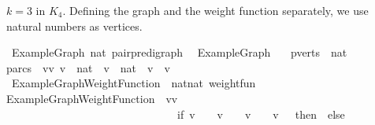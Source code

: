\begin{isabellebody}
\begin{isamarkuptext}
$k = 3$ in $K_4$. Defining the graph and the 
weight function separately, we use natural numbers as vertices.%
\end{isamarkuptext}\isamarkuptrue%
\isamarkupfalse%
\ ExampleGraph{\isacharcolon}{\isacharcolon}\ {\isachardoublequoteopen}nat\ pair{\isacharunderscore}pre{\isacharunderscore}digraph{\isachardoublequoteclose}\ \ \isanewline
{\isachardoublequoteopen}ExampleGraph\ {\isasymequiv}\ {\isacharparenleft}{\isacharbar}\ \isanewline
pverts\ {\isacharequal}\ {\isacharbraceleft}{}{\isacharcomma}{}{\isacharcomma}{}{\isacharcomma}{\isacharparenleft}{}{\isacharcolon}{\isacharcolon}nat{\isacharparenright}{\isacharbraceright}{\isacharcomma}\ \isanewline
parcs\ {\isacharequal}\ {\isacharbraceleft}{\isacharparenleft}vv\ v\ {\isasymin}\ {\isacharbraceleft}{}{\isacharcomma}{}{\isacharcomma}{}{\isacharcomma}{\isacharparenleft}{}{\isacharcolon}{\isacharcolon}nat{\isacharparenright}{\isacharbraceright}\ {\isasymand}\ v\ {\isasymin}\ {\isacharbraceleft}{}{\isacharcomma}{}{\isacharcomma}{}{\isacharcomma}{\isacharparenleft}{}{\isacharcolon}{\isacharcolon}nat{\isacharparenright}{\isacharbraceright}\ {\isasymand}\ v\ {\isasymnoteq}\ v\ \isanewline
{\isacharbar}{\isacharparenright}{\isachardoublequoteclose}\ \isanewline
\isanewline
{}\isamarkupfalse%
\ ExampleGraphWeightFunction\ {\isacharcolon}{\isacharcolon}\ {\isachardoublequoteopen}{\isacharparenleft}nat{\isasymtimes}nat{\isacharparenright}\ weight{\isacharunderscore}fun{\isachardoublequoteclose}\ \ \isanewline
{\isachardoublequoteopen}ExampleGraphWeightFunction\ {\isasymequiv}\ {\isacharparenleft}{\isasymlambda}{\isacharparenleft}vv\ \isanewline
\ \ \ \ \ \ \ \ \ \ \ \ \ \ \ \ \ \ \ \ \ \ \ \ \ \ \ \ \ \ \ if\ {\isacharparenleft}v\ {\isacharequal}\ {}\ {\isasymand}\ v\ {\isacharequal}\ {}{\isacharparenright}\ {\isasymor}\ {\isacharparenleft}v\ {\isacharequal}\ {}\ {\isasymand}\ v\ {\isacharequal}\ {}{\isacharparenright}\ then\ {}\ else\isanewline

\end{isabellebody}
